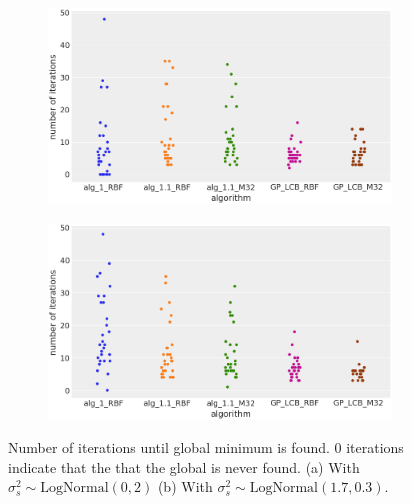 \begin{figure}[H]
        \centering
        \begin{subfigure}[b]{0.475\textwidth}
            \centering
            \includegraphics[width=\textwidth]{src/performanceplotorignalprior.png}
            \caption{}
            \label{fig:performance1}
        \end{subfigure}
        \hfill
        \begin{subfigure}[b]{0.475\textwidth}  
            \centering 
            \includegraphics[width=\textwidth]{src/performanceplotsnewprior.png}
            \caption{}
            \label{fig:performance2}
        \end{subfigure}
        \caption[]
        {Number of iterations until global minimum is found. 0 iterations indicate that the that the global is never found. (a) With $\sigma_\mathit{s}^2\sim\text{LogNormal}(0, 2)$ (b) With $\sigma_\mathit{s}^2\sim\text{LogNormal}(1.7, 0.3)$.} 
        \label{fig:performanceplots}
\end{figure}
    
